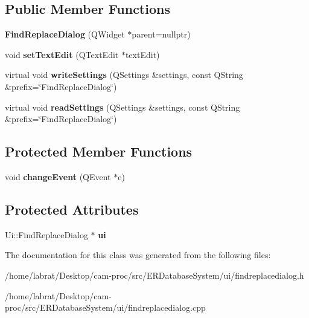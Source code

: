 \subsection*{Public Member Functions}
\begin{DoxyCompactItemize}
\item 
{\bfseries Find\+Replace\+Dialog} (Q\+Widget $\ast$parent=nullptr)\hypertarget{classFindReplaceDialog_aa5a98a2773539b366980489436400357}{}\label{classFindReplaceDialog_aa5a98a2773539b366980489436400357}

\item 
void {\bfseries set\+Text\+Edit} (Q\+Text\+Edit $\ast$text\+Edit)\hypertarget{classFindReplaceDialog_a3d3cd91477be5d6529e9aa3de21958a6}{}\label{classFindReplaceDialog_a3d3cd91477be5d6529e9aa3de21958a6}

\item 
virtual void {\bfseries write\+Settings} (Q\+Settings \&settings, const Q\+String \&prefix=\char`\"{}Find\+Replace\+Dialog\char`\"{})\hypertarget{classFindReplaceDialog_ad9216d8059c559596baa5ddcbda3ec0b}{}\label{classFindReplaceDialog_ad9216d8059c559596baa5ddcbda3ec0b}

\item 
virtual void {\bfseries read\+Settings} (Q\+Settings \&settings, const Q\+String \&prefix=\char`\"{}Find\+Replace\+Dialog\char`\"{})\hypertarget{classFindReplaceDialog_a2be8b8724a5f9a7e6dff30348f94761c}{}\label{classFindReplaceDialog_a2be8b8724a5f9a7e6dff30348f94761c}

\end{DoxyCompactItemize}
\subsection*{Protected Member Functions}
\begin{DoxyCompactItemize}
\item 
void {\bfseries change\+Event} (Q\+Event $\ast$e)\hypertarget{classFindReplaceDialog_a793bc999abeaedd4262d39161f521f35}{}\label{classFindReplaceDialog_a793bc999abeaedd4262d39161f521f35}

\end{DoxyCompactItemize}
\subsection*{Protected Attributes}
\begin{DoxyCompactItemize}
\item 
Ui\+::\+Find\+Replace\+Dialog $\ast$ {\bfseries ui}\hypertarget{classFindReplaceDialog_ab2511239f2c08d5c564db4939326bfa5}{}\label{classFindReplaceDialog_ab2511239f2c08d5c564db4939326bfa5}

\end{DoxyCompactItemize}


The documentation for this class was generated from the following files\+:\begin{DoxyCompactItemize}
\item 
/home/labrat/\+Desktop/cam-\/proc/src/\+E\+R\+Database\+System/ui/findreplacedialog.\+h\item 
/home/labrat/\+Desktop/cam-\/proc/src/\+E\+R\+Database\+System/ui/findreplacedialog.\+cpp\end{DoxyCompactItemize}
